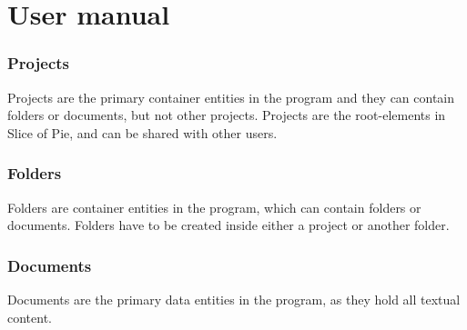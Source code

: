 \section{User manual}
\subsubsection{Projects}
Projects are the primary container entities in the program and they can contain folders or documents, but not other projects.
Projects are the root-elements in Slice of Pie, and can be shared with other users.

\subsubsection{Folders}
Folders are container entities in the program, which can contain folders or documents. Folders have to be created inside either a project or another folder.

\subsubsection{Documents}
Documents are the primary data entities in the program, as they hold all textual content.





